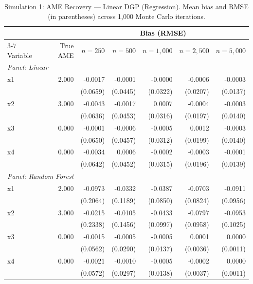 \documentclass[conference]{IEEEtran}
\begin{document}
	\begin{table}[htbp]
		\centering
		\small
		\begin{threeparttable}
			\caption{Simulation 1: AME Recovery --- Linear DGP (Regression). Mean bias and RMSE (in parentheses) across 1,000 Monte Carlo iterations.}
			\label{tab:sim1_regression_linear}
			\begin{tabular}{lrrrrrr}
				\toprule
				& & \multicolumn{5}{c}{Bias (RMSE)} \\
				\cmidrule(lr){3-7}
				Variable & True AME & $n=250$ & $n=500$ & $n=1,000$ & $n=2,500$ & $n=5,000$ \\
				\midrule
				\multicolumn{7}{l}{\textit{Panel: Linear}} \\
				\quad x1 & 2.000 & -0.0017 & -0.0001 & -0.0000 & -0.0006 & -0.0003 \\
				&  & (0.0659) & (0.0445) & (0.0322) & (0.0207) & (0.0137) \\
				\quad x2 & 3.000 & -0.0043 & -0.0017 & 0.0007 & -0.0004 & -0.0003 \\
				&  & (0.0636) & (0.0453) & (0.0316) & (0.0197) & (0.0140) \\
				\quad x3 & 0.000 & -0.0001 & -0.0006 & -0.0005 & 0.0012 & -0.0003 \\
				&  & (0.0650) & (0.0457) & (0.0312) & (0.0199) & (0.0140) \\
				\quad x4 & 0.000 & -0.0034 & 0.0006 & -0.0002 & -0.0003 & -0.0001 \\
				&  & (0.0642) & (0.0452) & (0.0315) & (0.0196) & (0.0139) \\
				\midrule
				\multicolumn{7}{l}{\textit{Panel: Random Forest}} \\
				\quad x1 & 2.000 & -0.0973 & -0.0332 & -0.0387 & -0.0703 & -0.0911 \\
				&  & (0.2064) & (0.1189) & (0.0850) & (0.0824) & (0.0956) \\
				\quad x2 & 3.000 & -0.0215 & -0.0105 & -0.0433 & -0.0797 & -0.0953 \\
				&  & (0.2338) & (0.1456) & (0.0997) & (0.0958) & (0.1025) \\
				\quad x3 & 0.000 & -0.0015 & -0.0005 & -0.0005 & 0.0001 & 0.0000 \\
				&  & (0.0562) & (0.0290) & (0.0137) & (0.0036) & (0.0011) \\
				\quad x4 & 0.000 & -0.0021 & -0.0010 & -0.0005 & -0.0002 & 0.0000 \\
				&  & (0.0572) & (0.0297) & (0.0138) & (0.0037) & (0.0011) \\
				\midrule

\end{tabular}
\end{threeparttable}
\end{table}
\end{document}
